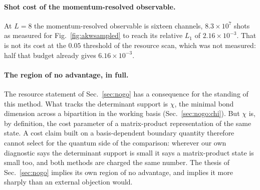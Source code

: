 \paragraph{Shot cost of the momentum-resolved observable.} At $L=8$ the momentum-resolved
observable is sixteen channels, $8.3\times10^{7}$ shots as measured for Fig.~\ref{fig:akwsampled} to
reach its relative $L_1$ of $2.16\times10^{-3}$. That is not its cost at the $0.05$ threshold of the
resource scan, which was not measured: half that budget already gives $6.16\times10^{-3}$.


\paragraph{The region of no advantage, in full.} The resource statement of Sec.~\ref{sec:nogo} has a consequence for the standing of this method. What tracks the determinant support is $\chi$,
the minimal bond dimension across a bipartition in the working basis (Sec.~\ref{sec:nogo:chi}). But
$\chi$ is, by definition, the cost parameter of a matrix-product representation of the same state. A
cost claim built on a basis-dependent boundary quantity therefore cannot select for the quantum side of
the comparison: wherever our own diagnostic says the determinant support is small it says a
matrix-product state is small too, and both methods are charged the same number. The thesis of
Sec.~\ref{sec:nogo} implies its own region of no advantage, and implies it more sharply than an
external objection would.

